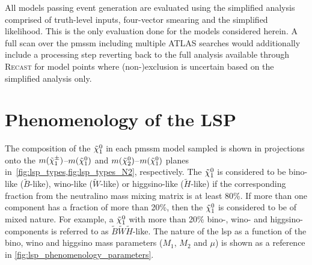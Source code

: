 All models passing event generation are evaluated using the simplified analysis comprised of truth-level inputs, four-vector smearing and the simplified likelihood. This is the only evaluation done for the models considered herein. A full scan over the \gls{pmssm} including multiple ATLAS searches would additionally include a processing step reverting back to the full analysis available through \textsc{Recast} for model points where (non-)exclusion is uncertain based on the simplified analysis only.

\section{Phenomenology of the LSP}\label{sec:lsp_pheno}

The composition of the $\tilde{\chi}_1^0$ in each \gls{pmssm} model sampled is shown in projections onto the $m(\tilde{\chi}_1^\pm)$--$m(\tilde{\chi}_1^0)$ and $m(\tilde{\chi}_2^0)$--$m(\tilde{\chi}_1^0)$ planes in~\cref{fig:lsp_types,fig:lsp_types_N2}, respectively. The $\tilde{\chi}_1^0$ is considered to be bino-like ($\tilde{B}$-like), wino-like ($\tilde{W}$-like) or higgsino-like ($\tilde{H}$-like) if the corresponding fraction from the neutralino mass mixing matrix is at least 80\%. If more than one component has a fraction of more than 20\%, then the $\tilde{\chi}_1^0$ is considered to be of mixed nature. For example, a $\tilde{\chi}_1^0$ with more than 20\% bino-, wino- and higgsino-components is referred to as $\tilde{B}\tilde{W}\tilde{H}$-like. The nature of the \gls{lsp} as a function of the bino, wino and higgsino mass parameters ($M_1$, $M_2$ and $\mu$) is shown as a reference in \cref{fig:lsp_phenomenology_parameters}. 

